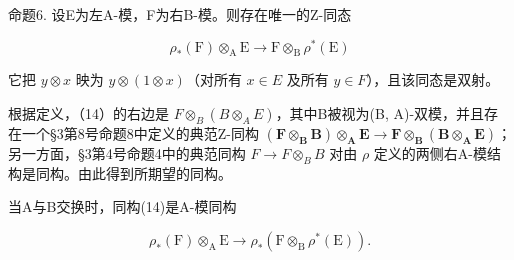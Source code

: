 命题6. 设E为左A-模，F为右B-模。则存在唯一的Z-同态

\[
\rho_ {*} (\mathrm{F}) \otimes_ {\mathrm{A}} \mathrm{E} \rightarrow \mathrm{F} \otimes_ {\mathrm{B}} \rho^ {*} (\mathrm{E})\tag{14}
\]

它把 \(y \otimes x\) 映为 \(y \otimes (1 \otimes x)\)（对所有 \(x \in E\) 及所有 \(y \in F\)），且该同态是双射。

根据定义，（14）的右边是 \(F \otimes_{B} (B \otimes_{A} E)\)，其中B被视为(B, A)-双模，并且存在一个§3第8号命题8中定义的典范Z-同构 \((\mathbf{F} \otimes_{\mathbf{B}} \mathbf{B}) \otimes_{\mathbf{A}} \mathbf{E} \to \mathbf{F} \otimes_{\mathbf{B}} (\mathbf{B} \otimes_{\mathbf{A}} \mathbf{E})\)；另一方面，§3第4号命题4中的典范同构 \(F \to F \otimes_{B} B\) 对由 \(\rho\) 定义的两侧右A-模结构是同构。由此得到所期望的同构。

当A与B交换时，同构(14)是A-模同构

\[
\rho_ {*} (\mathrm{F}) \otimes_ {\mathrm{A}} \mathrm{E} \rightarrow \rho_ {*} (\mathrm{F} \otimes_ {\mathrm{B}} \rho^ {*} (\mathrm{E})).
\]

